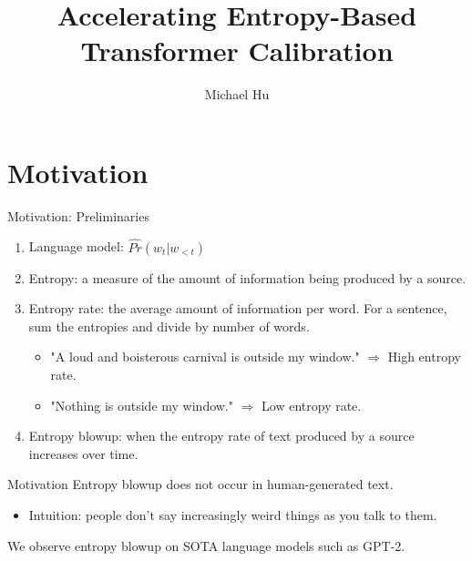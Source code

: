\documentclass{beamer}
\title{Accelerating Entropy-Based Transformer Calibration}
\author{Michael Hu}
\institute{Advisor: Karthik Narasimhan}
\date{} %
\begin{document}
{ 
\frame{\titlepage}}




\section{Motivation}

\begin{frame}{Motivation: Preliminaries}

\begin{enumerate}
    \item Language model: $\widehat{Pr}(w_t | w_{<t})$
    \pause
    \item Entropy: a measure of the amount of information being produced by a source.
    \pause
    \item Entropy rate: the average amount of information per word. For a sentence, sum the entropies and divide by number of words.
    \pause
        \begin{itemize}
            \item "A loud and boisterous carnival is outside my window."  
            $\Rightarrow$ High entropy rate.
            \pause
            \item "Nothing is outside my window." $\Rightarrow$ Low entropy rate.
            \pause
        \end{itemize}
    \item Entropy blowup: when the entropy rate of text produced by a source increases over time.
\end{enumerate}
\end{frame}

\begin{frame}{Motivation}
Entropy blowup does not occur in human-generated text.
\begin{itemize}
    \item Intuition: people don't say increasingly weird things as you talk to them.
\end{itemize}
\pause
We observe entropy blowup on SOTA language models such as GPT-2. 
\end{frame}
\end{document}
